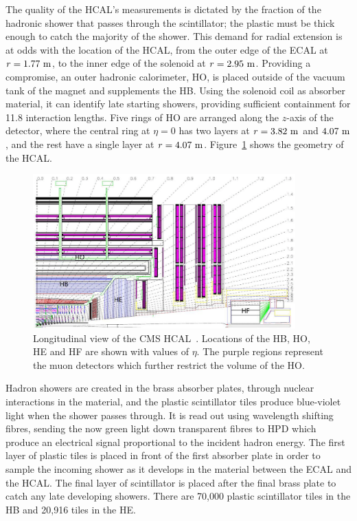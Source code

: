 The quality of the \ac{HCAL}'s measurements is dictated by the fraction of the hadronic shower that passes through the scintillator; the plastic must be thick enough to catch the majority of the shower.
This demand for radial extension is at odds with the location of the \ac{HCAL}, from the outer edge of the \ac{ECAL} at $r=1.77~\mathrm{m}$, to the inner edge of the solenoid at $r=2.95~\mathrm{m}$.
Providing a compromise, an outer hadronic calorimeter, \ac{HO}, is placed outside of the vacuum tank of the magnet and supplements the \ac{HB}.
Using the solenoid coil as absorber material, it can identify late starting showers, providing sufficient containment for 11.8 interaction lengths. %
Five rings of \ac{HO} are arranged along the $z$-axis of the detector, where the central ring at $\eta=0$ has two layers at $r=3.82~\mathrm{m}$ and $4.07~\mathrm{m}$, and the rest have a single layer at $r=4.07~\mathrm{m}$. 
Figure~\ref{fig:CMShcal} shows the geometry of the \ac{HCAL}.

\begin{figure}[htbp]
  \begin{center}
  \includegraphics[width=0.9\textwidth]{Figures/detector/cmsHCAL}
  \caption{Longitudinal view of the \ac{CMS} \ac{HCAL}~\cite{Chatrchyan:2008zzk}. Locations of the \ac{HB}, \ac{HO}, \ac{HE} and \ac{HF} are shown with values of $\eta$. The purple regions represent the muon detectors which further restrict the volume of the \ac{HO}.
}
  \label{fig:CMShcal}
  \end{center}
\end{figure}

Hadron showers are created in the brass absorber plates, through nuclear interactions in the material, and the plastic scintillator tiles produce blue-violet light when the shower passes through. 
It is read out using wavelength shifting fibres, sending the now green light down transparent fibres to \ac{HPD} which produce an electrical signal proportional to the incident hadron energy.
The first layer of plastic tiles is placed in front of the first absorber plate in order to sample the incoming shower as it develops in the material between the \ac{ECAL} and the \ac{HCAL}.
The final layer of scintillator is placed after the final brass plate to catch any late developing showers.
There are 70,000 plastic scintillator tiles in the \ac{HB} and 20,916 tiles in the \ac{HE}.

